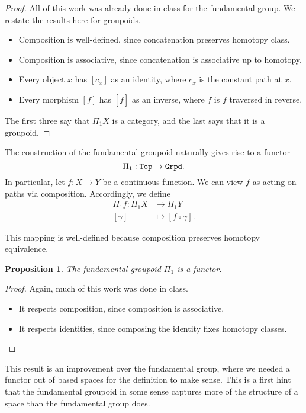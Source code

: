\documentclass[11 pt]{amsart}
\theoremstyle{plain}   %
\newtheorem{prop}{Proposition}[section]
\theoremstyle{definition}
\theoremstyle{remark}
\numberwithin{equation}{section}
\newcommand{\cat}[1]{{\normalfont\texttt{#1}}}
\begin{document}
\begin{proof}
	All of this work was already done in class for the fundamental group. We
	restate the results here for groupoids.
	\begin{itemize}
		\item Composition is well-defined, since concatenation preserves homotopy
		      class.
		\item Composition is associative, since concatenation is associative up to
		      homotopy.
		\item Every object $x$ has $[c_x]$ as an identity, where $c_x$ is the
		      constant path at $x$.
		\item Every morphism $[f]$ has $[\bar{f}]$ as an inverse, where $\bar{f}$ is
		      $f$ traversed in reverse.
	\end{itemize}

	The first three say that $\Pi_1X$ is a category, and the last says that it
	is a groupoid.
\end{proof}

The construction of the fundamental groupoid naturally gives rise to a functor
$$\Pi_1: \cat{Top}\rightarrow\cat{Grpd}.$$ In particular, let $f: X\rightarrow
	Y$ be a continuous function. We can view $f$ as acting on paths via composition.
Accordingly, we define
\begin{align*}
	\Pi_1f  \colon \Pi_1X & \to \Pi_1Y              \\
	[\gamma]              & \mapsto [f\circ\gamma].
\end{align*}

This mapping is well-defined because composition preserves homotopy equivalence.

\begin{prop}\label{fundamental groupoid is a functor}
	The fundamental groupoid $\Pi_1$ is a functor.
\end{prop}

\begin{proof}
	Again, much of this work was done in class.
	\begin{itemize}
		\item It respects composition, since composition is associative.
		\item It respects identities, since composing the identity fixes homotopy classes. \qedhere
	\end{itemize}
\end{proof}

This result is an improvement over the fundamental group, where we needed a
functor out of based spaces for the definition to make sense. This is a first
hint that the fundamental groupoid in some sense captures more of the structure
of a space than the fundamental group does.
\end{document}

